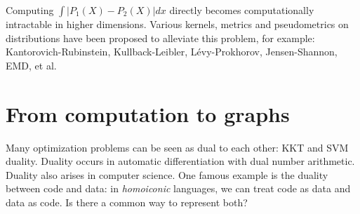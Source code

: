 \documentclass[11pt]{article}
\begin{document}
    \begin{figure}[!h]
    \centering
    \end{figure}

    \noindent Computing $\int |P_1(X) - P_2(X)| dx$ directly becomes computationally intractable in higher dimensions. Various kernels, metrics and pseudometrics on distributions have been proposed to alleviate this problem, for example: Kantorovich-Rubinstein, Kullback-Leibler, L\'evy-Prokhorov, Jensen-Shannon, EMD, et al.

    \pagebreak

    \section{From computation to graphs}\label{sec:graphs}


    Many optimization problems can be seen as dual to each other: KKT and SVM duality. Duality occurs in automatic differentiation with dual number arithmetic. Duality also arises in computer science. One famous example is the duality between code and data: in \textit{homoiconic} languages, we can treat code as data and data as code. Is there a common way to represent both?
\end{document}
